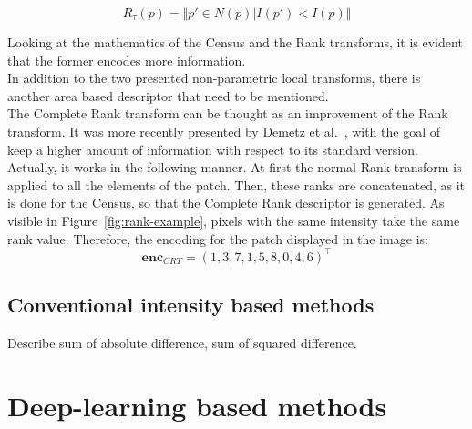 \begin{equation}
	\label{eqn:rank-transform}
	R_{\tau}(p) = \Vert {p' \in N(p) \vert I(p') < I(p)} \Vert	
\end{equation}

Looking at the mathematics of the Census and the Rank transforms, it is evident that the former encodes more information. \\
In addition to the two presented non-parametric local transforms, there is another area based descriptor that need to be mentioned.\\
The Complete Rank transform can be thought as an improvement of the Rank transform.
It was more recently presented by Demetz et al.~\cite{Demetz2013}, with the goal of keep a higher amount of information with respect to its standard version.
Actually, it works in the following manner.
At first the normal Rank transform is applied to all the elements of the patch. 
Then, these ranks are concatenated, as it is done for the Census, so that the Complete Rank descriptor is generated.  
As visible in Figure~\ref{fig:rank-example}, pixels with the same intensity take the same rank value. 
Therefore, the encoding for the patch displayed in the image is:
\begin{equation}
	\label{eqn:complete-rank-encoding}
	\mathbf{enc}_{CRT} = (1, 3, 7, 1, 5, 8, 0, 4, 6)^\top
\end{equation}

\subsection{Conventional intensity based methods}
\label{subsection:conventional-methods}

Describe sum of absolute difference, sum of squared difference.
\section{Deep-learning based methods}
\label{section:deep-learning-method}

